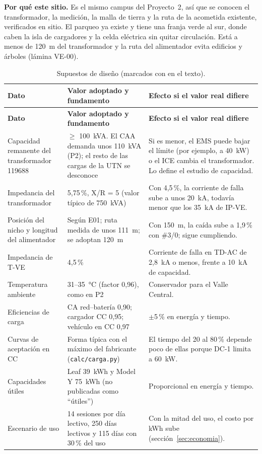 \textbf{Por qué este sitio.} Es el mismo campus del Proyecto~2, así que se conocen el transformador, la medición, la malla de tierra y la ruta de la acometida existente, verificados en sitio. El parqueo ya existe y tiene una franja verde al sur, donde caben la isla de cargadores y la celda eléctrica sin quitar circulación. Está a menos de 120~m del transformador y la ruta del alimentador evita edificios y árboles (lámina VE-00).

{\small
\begin{longtable}{L{3.3cm}L{5.4cm}L{6.3cm}}
\caption{Supuestos de diseño (marcados con \supuesto{} en el texto).}\label{tab:supuestos}\\
\toprule
\textbf{Dato} & \textbf{Valor adoptado y fundamento} & \textbf{Efecto si el valor real difiere}\\
\midrule\endfirsthead
\toprule
\textbf{Dato} & \textbf{Valor adoptado y fundamento} & \textbf{Efecto si el valor real difiere}\\
\midrule\endhead
Capacidad remanente del transformador 119688 & $\ge$ 100~kVA. El CAA demanda unos 110~kVA (P2); el resto de las cargas de la UTN se desconoce & Si es menor, el EMS puede bajar el límite (por ejemplo, a 40~kW) o el ICE cambia el transformador. Lo define el estudio de capacidad.\\
Impedancia del transformador & 5,75\,\%, X/R = 5 (valor típico de 750~kVA) & Con 4,5\,\%, la corriente de falla sube a unos 20~kA, todavía menor que los 35~kA de IP-VE.\\
Posición del nicho y longitud del alimentador & Según E01; ruta medida de unos 111~m; se adoptan 120~m & Con 150~m, la caída sube a 1,9\,\% con \#3/0; sigue cumpliendo.\\
Impedancia de T-VE & 4,5\,\% & Corriente de falla en TD-AC de 2,8~kA o menos, frente a 10~kA de capacidad.\\
Temperatura ambiente & 31--35~°C (factor 0,96), como en P2 & Conservador para el Valle Central.\\
Eficiencias de carga & CA red--batería 0,90; cargador CC 0,95; vehículo en CC 0,97 & $\pm$5\,\% en energía y tiempo.\\
Curvas de aceptación en CC & Forma típica con el máximo del fabricante (\texttt{calc/carga.py}) & El tiempo del 20 al 80\,\% depende poco de ellas porque DC-1 limita a 60~kW.\\
Capacidades útiles & Leaf 39~kWh y Model Y 75~kWh (no publicadas como ``útiles'') & Proporcional en energía y tiempo.\\
Escenario de uso & 14 sesiones por día lectivo, 250 días lectivos y 115 días con 30\,\% del uso & Con la mitad del uso, el costo por kWh sube (sección~\ref{sec:economia}).\\

\end{longtable}}
